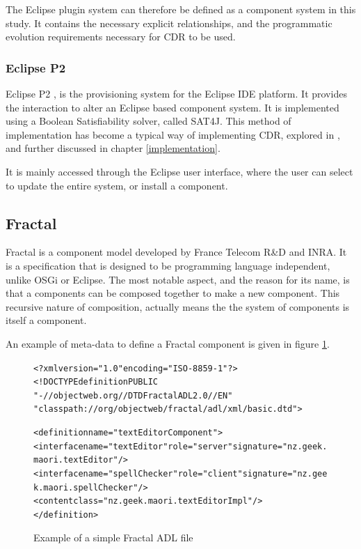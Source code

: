 The Eclipse plugin system can therefore be defined as a component system in this study.
It contains the necessary explicit relationships, and the programmatic evolution requirements necessary for CDR to be used.

\subsubsection{Eclipse P2}
Eclipse P2 \cite{le_berre_dependency_2009}, \cite{leBerre2010} is the provisioning system for the Eclipse IDE platform.
It provides the interaction to alter an Eclipse based component system. 
It is implemented using a Boolean Satisfiability solver, called SAT4J.
This method of implementation has become a typical way of implementing CDR, explored in \cite{Berre2008}, and further discussed in chapter \ref{implementation}.

It is mainly accessed through the Eclipse user interface, where the user can select to update the entire system, or install a component.

\subsection{Fractal}
Fractal is a component model developed by France Telecom R\&D and INRA.
It is a specification that is designed to be programming language independent, unlike OSGi or Eclipse.
The most notable aspect, and the reason for its name, is that a components can be composed together to make a new component.
This recursive nature of composition, actually means the the system of components is itself a component.

An example of meta-data to define a Fractal component is given in figure \ref{fractalmetadata}.

\begin{figure}[htp]
\begin{center}
\begin{alltt}
<?xml version="1.0" encoding="ISO-8859-1" ?>
<!DOCTYPE definition PUBLIC 
    "-//objectweb.org//DTD Fractal ADL 2.0//EN" 
    "classpath://org/objectweb/fractal/adl/xml/basic.dtd">

<definition name="textEditorComponent">
  <interface name="textEditor" role="server" signature="nz.geek.maori.textEditor"/>
  <interface name="spellChecker" role="client" signature="nz.geek.maori.spellChecker"/>
  <content class="nz.geek.maori.textEditorImpl"/>
</definition>
\end{alltt}
  \caption[Fractal ADL Example]{Example of a simple Fractal ADL file}
  \label{fractalmetadata}
\end{center}
\end{figure}

